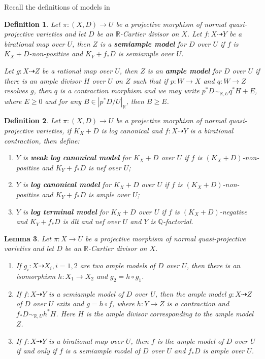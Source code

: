 \documentclass[11pt]{amsart}
\newtheorem{defn}{Definition}[section]
\newtheorem{lem}[defn]{Lemma}
\begin{document}
Recall the definitions of models in \cite{BCHM10}
\begin{defn}
  \cite[Definition 3.6.5]{BCHM10} Let $ \pi:(X,D)\to U $ be a projective morphism of normal quasi-projective varieties and let $D$ be an $\mathbb{R}$-Cartier divisor on $X$. Let $ f:X\dashrightarrow Y $ be a birational map over $ U $, then $ Z $ is a \textbf{semiample model } for $ D $ over $ U $ if $ f $ is $ K_X+D $-non-positive and $ K_Y+f_*D $ is semiample over $ U $.

  Let $ g:X\dashrightarrow Z $ be a rational map over $ U $, then $ Z $ is an \textbf{ample model } for $ D $ over $ U $ if there is  an ample divisor $H$  over $U$  on $Z$  such that if $p:W \to X $ and $q:W \to Z $ resolves $g$, then $q$ is a contraction morphism and we may write $p^*D \sim_{\mathbb{R},U} q^*H+E$, where $E\geqslant 0$ and for any $B \in |p^*D/U|_{\mathbb{R}}$, then $B\geqslant E$.
\end{defn}
\begin{defn}\label{models}
  \cite[Definition 3.6.7]{BCHM10} Let $ \pi:(X,D)\to U $ be a projective morphism of normal quasi-projective varieties, if $ K_X+D $ is log canonical and $ f:X\dashrightarrow Y $ is a birational contraction, then define:
  \begin{enumerate}
    \item $ Y $ is \textbf{weak log canonical model} for $ K_X+D $ over $ U $ if $ f $ is $ (K_X+D) $-non-positive and $ K_Y+f_*D $ is nef over $ U $;
    \item $ Y $ is \textbf{ log canonical model} for $ K_X+D $ over $ U $ if $ f $ is $ (K_X+D) $-non-positive and $ K_Y+f_*D $ is ample over $ U $;
    \item $ Y $ is \textbf{ log terminal model} for $ K_X+D $ over $ U $ if $ f $ is $ (K_X+D)$-negative and $ K_Y+f_*D $ is dlt and nef over $ U $ and $ Y $ is $ \mathbb{Q} $-factorial.
  \end{enumerate}
\end{defn}

\begin{lem}\cite[Lemma 3.6.6]{BCHM10}
  Let $\pi:X \to U$ be a projective morphism of normal quasi-projective varieties and let $D$ be an $\mathbb{R}$-Cartier divisor on $X$.
  \begin{enumerate}
    \item If $g_{i}:X \dashrightarrow X_{i}, i=1,2$ are two ample models of $D$ over $U$, then there is an isomorphism $h:X_{1}\to X_{2}$ and $g_{2}=h \circ g_{1}$.
    \item If $f:X \dashrightarrow Y$ is a semiample model of $D$ over $U$, then the ample model $g:X \dashrightarrow  Z$ of $D$ over $U$   exits and $g=h \circ f$, where $h:Y \to Z$ is a contraction and $f_*D \sim_{\mathbb{R},U}h^*H$. Here $H$ is the ample divisor corresponding to the ample model $Z$. 
  \item  If $f:X \dashrightarrow Y$ is a birational map over $U$, then $f$ is the ample model of $D$ over $U$ if and only if $f$ is a semiample model of $D$ over $U$ and $f_*D$ is ample over $U$.     
  \end{enumerate}
\end{lem}
\end{document}
